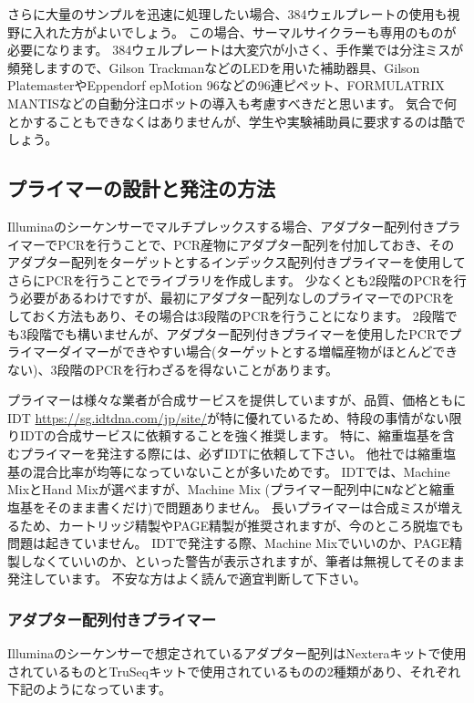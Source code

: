 \documentclass[titlepage,10pt,a4paper,uplatex]{jsbook}
\begin{document}
さらに大量のサンプルを迅速に処理したい場合、384ウェルプレートの使用も視野に入れた方がよいでしょう。
この場合、サーマルサイクラーも専用のものが必要になります。
384ウェルプレートは大変穴が小さく、手作業では分注ミスが頻発しますので、Gilson TrackmanなどのLEDを用いた補助器具、Gilson PlatemasterやEppendorf epMotion 96などの96連ピペット、FORMULATRIX MANTISなどの自動分注ロボットの導入も考慮すべきだと思います。
気合で何とかすることもできなくはありませんが、学生や実験補助員に要求するのは酷でしょう。

\subsection{プライマーの設計と発注の方法}

Illuminaのシーケンサーでマルチプレックスする場合、アダプター配列付きプライマーでPCRを行うことで、PCR産物にアダプター配列を付加しておき、そのアダプター配列をターゲットとするインデックス配列付きプライマーを使用してさらにPCRを行うことでライブラリを作成します。
少なくとも2段階のPCRを行う必要があるわけですが、最初にアダプター配列なしのプライマーでのPCRをしておく方法もあり、その場合は3段階のPCRを行うことになります。
2段階でも3段階でも構いませんが、アダプター配列付きプライマーを使用したPCRでプライマーダイマーができやすい場合(ターゲットとする増幅産物がほとんどできない)、3段階のPCRを行わざるを得ないことがあります。

プライマーは様々な業者が合成サービスを提供していますが、品質、価格ともにIDT \url{https://sg.idtdna.com/jp/site/}が特に優れているため、特段の事情がない限りIDTの合成サービスに依頼することを強く推奨します。
特に、縮重塩基を含むプライマーを発注する際には、必ずIDTに依頼して下さい。
他社では縮重塩基の混合比率が均等になっていないことが多いためです。
IDTでは、Machine MixとHand Mixが選べますが、Machine Mix (プライマー配列中に\texttt{N}などと縮重塩基をそのまま書くだけ)で問題ありません。
長いプライマーは合成ミスが増えるため、カートリッジ精製やPAGE精製が推奨されますが、今のところ脱塩でも問題は起きていません。
IDTで発注する際、Machine Mixでいいのか、PAGE精製しなくていいのか、といった警告が表示されますが、筆者は無視してそのまま発注しています。
不安な方はよく読んで適宜判断して下さい。

\subsubsection{アダプター配列付きプライマー}

Illuminaのシーケンサーで想定されているアダプター配列はNexteraキットで使用されているものとTruSeqキットで使用されているものの2種類があり、それぞれ下記のようになっています。
\end{document}
